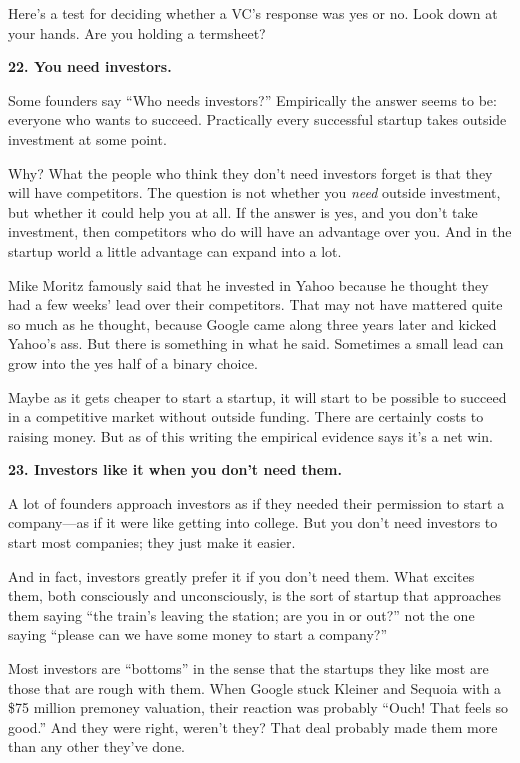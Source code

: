 Here's a test for deciding whether a VC's response was yes or no. Look
down at your hands. Are you holding a termsheet?

\textbf{22. You need investors.}

Some founders say ``Who needs investors?'' Empirically the answer seems
to be: everyone who wants to succeed. Practically every successful
startup takes outside investment at some point.

Why? What the people who think they don't need investors forget is that
they will have competitors. The question is not whether you \emph{need}
outside investment, but whether it could help you at all. If the answer
is yes, and you don't take investment, then competitors who do will have
an advantage over you. And in the startup world a little advantage can
expand into a lot.

Mike Moritz famously said that he invested in Yahoo because he thought
they had a few weeks' lead over their competitors. That may not have
mattered quite so much as he thought, because Google came along three
years later and kicked Yahoo's ass. But there is something in what he
said. Sometimes a small lead can grow into the yes half of a binary
choice.

Maybe as it gets cheaper to start a startup, it will start to be
possible to succeed in a competitive market without outside funding.
There are certainly costs to raising money. But as of this writing the
empirical evidence says it's a net win.

\textbf{23. Investors like it when you don't need them.}

A lot of founders approach investors as if they needed their permission
to start a company---as if it were like getting into college. But you
don't need investors to start most companies; they just make it easier.

And in fact, investors greatly prefer it if you don't need them. What
excites them, both consciously and unconsciously, is the sort of startup
that approaches them saying ``the train's leaving the station; are you
in or out?'' not the one saying ``please can we have some money to start
a company?''

Most investors are ``bottoms'' in the sense that the startups they like
most are those that are rough with them. When Google stuck Kleiner and
Sequoia with a \$75 million premoney valuation, their reaction was
probably ``Ouch! That feels so good.'' And they were right, weren't
they? That deal probably made them more than any other they've done.

